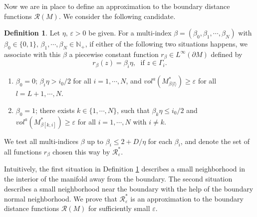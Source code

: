 \documentclass[11pt,letterpaper]{amsart}
\numberwithin{equation}{section}
\theoremstyle{definition}
\theoremstyle{plain}
\theoremstyle{definition}
\theoremstyle{plain}
\theoremstyle{definition}
\newtheorem{def-section5}[volume]{Definition}
\theoremstyle{plain}
\begin{document}
Now we are in place to define an approximation to the boundary distance functions $\mathcal{R}(M)$. We consider the following candidate.

\begin{def-section5}\label{Rast}
Let $\eta,\,\varepsilon>0$ be given. For a multi-index $\beta=(\beta_0,\beta_1,\cdots,\beta_N)$ with $\beta_0\in\{0,1\},\,\beta_1,\cdots,\beta_N \in\mathbb{N}_+$, if either of the following two situations happens, we associate with this $\beta$ a piecewise constant function $r_{\beta}\in L^{\infty}(\partial M)$ defined by
$$r_{\beta}(z)=\beta_i \eta, \;\textrm{ if }z\in \Gamma_i.$$

\begin{enumerate}[(1)]
\item $\beta_0=0$; $\beta_i\eta>i_0/2$ for all $i=1,\cdots,N$, and $vol^a(M_{\beta\langle l\rangle}^{\ast})\geqslant \varepsilon$ for all $l=L+1,\cdots,N$.

\item $\beta_0=1$; there exists $k\in \{1,\cdots,N\}$, such that $\beta_k\eta\leqslant i_0/2$ and $vol^a(M_{\beta[k,i]}^{\ast})\geqslant \varepsilon$ for all $i=1,\cdots,N$ with $i\neq k$.
\end{enumerate}

We test all multi-indices $\beta$ up to $\beta_i\leqslant 2+D/\eta$ for each $\beta_i$, and denote the set of all functions $r_{\beta}$ chosen this way by $\mathcal{R}^{\ast}_{\varepsilon}$. 
\end{def-section5}

Intuitively, the first situation in Definition \ref{Rast} describes a small neighborhood in the interior of the manifold away from the boundary. The second situation describes a small neighborhood near the boundary with the help of the boundary normal neighborhood. We prove that $\mathcal{R}^{\ast}_{\varepsilon}$ is an approximation to the boundary distance functions $\mathcal{R}(M)$ for sufficiently small $\varepsilon$.
\end{document}
